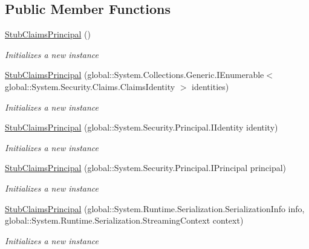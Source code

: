 \subsection*{Public Member Functions}
\begin{DoxyCompactItemize}
\item 
\hyperlink{class_system_1_1_security_1_1_claims_1_1_fakes_1_1_stub_claims_principal_afc5aa1465468f78598607caf5248a6f4}{Stub\-Claims\-Principal} ()
\begin{DoxyCompactList}\small\item\em Initializes a new instance\end{DoxyCompactList}\item 
\hyperlink{class_system_1_1_security_1_1_claims_1_1_fakes_1_1_stub_claims_principal_a7a84c3ff5f245e275e9f68d0a21e772e}{Stub\-Claims\-Principal} (global\-::\-System.\-Collections.\-Generic.\-I\-Enumerable$<$ global\-::\-System.\-Security.\-Claims.\-Claims\-Identity $>$ identities)
\begin{DoxyCompactList}\small\item\em Initializes a new instance\end{DoxyCompactList}\item 
\hyperlink{class_system_1_1_security_1_1_claims_1_1_fakes_1_1_stub_claims_principal_afeb5914b6acf081f60b9a9b0e6e17e27}{Stub\-Claims\-Principal} (global\-::\-System.\-Security.\-Principal.\-I\-Identity identity)
\begin{DoxyCompactList}\small\item\em Initializes a new instance\end{DoxyCompactList}\item 
\hyperlink{class_system_1_1_security_1_1_claims_1_1_fakes_1_1_stub_claims_principal_a953ad2a7819b97c960ca90236e0851cd}{Stub\-Claims\-Principal} (global\-::\-System.\-Security.\-Principal.\-I\-Principal principal)
\begin{DoxyCompactList}\small\item\em Initializes a new instance\end{DoxyCompactList}\item 
\hyperlink{class_system_1_1_security_1_1_claims_1_1_fakes_1_1_stub_claims_principal_aa272eedd8bc68d698b0fe02e1bcdec3b}{Stub\-Claims\-Principal} (global\-::\-System.\-Runtime.\-Serialization.\-Serialization\-Info info, global\-::\-System.\-Runtime.\-Serialization.\-Streaming\-Context context)
\begin{DoxyCompactList}\small\item\em Initializes a new instance\end{DoxyCompactList}\item 

\end{DoxyCompactItemize}
